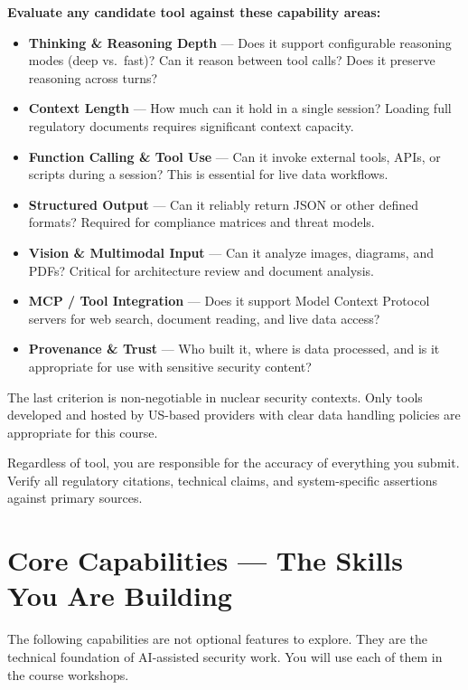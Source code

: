 \documentclass[9pt]{extarticle}
\begin{document}
\textbf{Evaluate any candidate tool against these capability areas:}

\begin{itemize}
    \item \textbf{Thinking \& Reasoning Depth} --- Does it support configurable
          reasoning modes (deep vs.\ fast)? Can it reason between tool calls?
          Does it preserve reasoning across turns?
    \item \textbf{Context Length} --- How much can it hold in a single session?
          Loading full regulatory documents requires significant context capacity.
    \item \textbf{Function Calling \& Tool Use} --- Can it invoke external tools,
          APIs, or scripts during a session? This is essential for live data workflows.
    \item \textbf{Structured Output} --- Can it reliably return JSON or other
          defined formats? Required for compliance matrices and threat models.
    \item \textbf{Vision \& Multimodal Input} --- Can it analyze images, diagrams,
          and PDFs? Critical for architecture review and document analysis.
    \item \textbf{MCP / Tool Integration} --- Does it support Model Context Protocol
          servers for web search, document reading, and live data access?
    \item \textbf{Provenance \& Trust} --- Who built it, where is data processed,
          and is it appropriate for use with sensitive security content?
\end{itemize}

The last criterion is non-negotiable in nuclear security contexts. Only tools
developed and hosted by US-based providers with clear data handling policies
are appropriate for this course.

Regardless of tool, you are responsible for the accuracy of everything you submit.
Verify all regulatory citations, technical claims, and system-specific assertions
against primary sources.

\section*{Core Capabilities --- The Skills You Are Building}

The following capabilities are not optional features to explore. They are the
technical foundation of AI-assisted security work. You will use each of them
in the course workshops.
\end{document}

